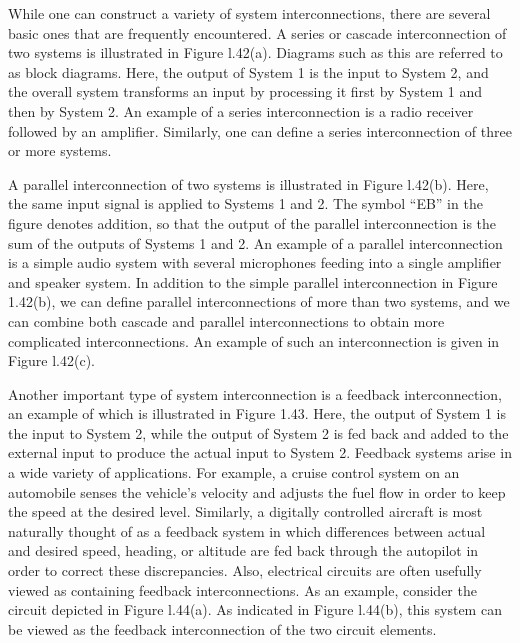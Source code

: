 \documentclass{report}
\begin{document}
While one can construct a variety of system interconnections, there are several basic ones that are frequently encountered. A series or cascade interconnection
of two systems is illustrated in Figure l.42(a). Diagrams such as this are referred to as block diagrams. Here, the output of System 1 is the input
to System 2, and the overall system transforms an input by processing it first by System 1 and then by System 2. An example of a series interconnection
is a radio receiver followed by an amplifier. Similarly, one can define a series interconnection of three or more systems.

A parallel interconnection of two systems is illustrated in Figure l.42(b). Here, the same input signal is applied to Systems 1 and 2. The symbol
{``}EB{''} in the figure denotes addition, so that the output of the parallel interconnection is the sum of the outputs of Systems 1 and 2. An example
of a parallel interconnection is a simple audio system with several microphones feeding into a single amplifier and speaker system. In addition to
the simple parallel interconnection in Figure 1.42(b), we can define parallel interconnections of more than two systems, and we can combine both
cascade and parallel interconnections to obtain more complicated interconnections. An example of such an interconnection is given in Figure l.42(c).

Another important type of system interconnection is a feedback interconnection, an example of which is illustrated in Figure 1.43. Here, the output
of System 1 is the input to System 2, while the output of System 2 is fed back and added to the external input to produce the actual input to System
2. Feedback systems arise in a wide variety of applications. For example, a cruise control system on an automobile senses the vehicle's velocity
and adjusts the fuel flow in order to keep the speed at the desired level. Similarly, a digitally controlled aircraft is most naturally thought of
as a feedback system in which differences between actual and desired speed, heading, or altitude are fed back through the autopilot in order to correct
these discrepancies. Also, electrical circuits are often usefully viewed as containing feedback interconnections. As an example, consider the circuit
depicted in Figure l.44(a). As indicated in Figure l.44(b), this system can be viewed as the feedback interconnection of the two circuit elements.
\end{document}
